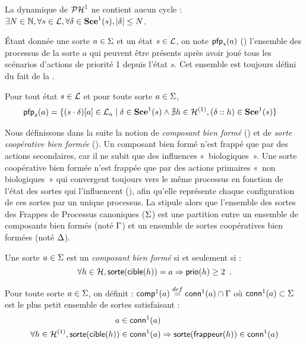 \begin{condition}
  La dynamique de $\mathcal{PH}^1$ ne contient aucun cycle :
  $\exists N \in \mathbb{N}, \forall s \in \mathcal{L}, \forall \delta \in \mathbf{Sce}^1(s),
    |\delta| \leq N$.
\end{condition}

Étant donnée une sorte $a \in \Sigma$ et un état $s \in \mathcal{L}$,
on note $\mathsf{pfp}_s(a)$ () l'ensemble des processus de la sorte $a$ qui peuvent être présents
après avoir joué tous les scénarios d'actions de priorité 1 depuis l'état $s$.
Cet ensemble est toujours défini du fait de la .

\begin{definition}[$\pfp : \PHl \times \PHs \rightarrow \powerset(\PHproc)$]
  Pour tout état $s \in \mathcal{L}$ et pour toute sorte $a \in \Sigma$,
  \begin{align*}
    \mathsf{pfp}_s(a) = \{ (s\cdot\delta)[{a}] \in \mathcal{L}_a &\mid \delta \in \mathbf{Sce}^1(s)
          \wedge\nexists h\in\mathcal{H}^{(1)}, (\delta :: h) \in \mathbf{Sce}^1(s) \}
  \end{align*}
\end{definition}

Nous définissons dans la suite la notion de \emph{composant bien formé} ()
et de \emph{sorte coopérative bien formée} ().
Un composant bien formé n'est frappé que par des actions secondaires,
car il ne subit que des influences «~biologiques~».
Une sorte coopérative bien formée n'est frappée que par des actions primaires «~non biologiques~»
qui convergent toujours vers le même processus en fonction de l'état des sortes qui l'influencent
(), afin qu'elle représente chaque configuration de ces sortes par un unique processus.
La  stipule alors que l'ensemble des sortes des Frappes de Processus canoniques
($\Sigma$) est une partition entre un ensemble de composants bien formés (noté $\Gamma$)
et un ensemble de sortes coopératives bien formées (noté $\Delta$).

\begin{definition}
  Une sorte $a \in \Sigma$ est un \emph{composant bien formé} si et seulement si :
    \[\forall h \in \mathcal{H}, \mathsf{sorte}(\mathsf{cible}(h)) = a \Rightarrow \mathsf{prio}(h) \geq 2 \enspace.\]
\end{definition}

\begin{definition}
  Pour toute sorte $a \in \Sigma$, on définit : $\mathsf{comp}^1(a) \stackrel{def}= \mathsf{conn}^1(a) \cap \Gamma$ où
  $\mathsf{conn}^1(a) \subset \Sigma$ est le plus petit ensemble de sortes satisfaisant :
  \begin{align*}
    a \in \mathsf{conn}^1(a) & \\
    \forall h \in \mathcal{H}^{(1)},
      \mathsf{sorte}(\mathsf{cible}(h)) \in \mathsf{conn}^1(a) & \Rightarrow \mathsf{sorte}(\mathsf{frappeur}(h)) \in \mathsf{conn}^1(a)
  \end{align*}
\end{definition}

